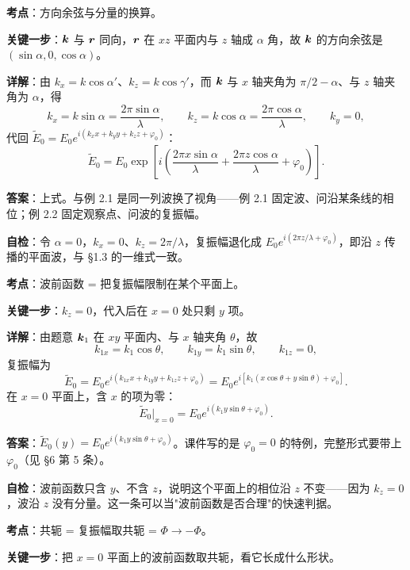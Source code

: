 \documentclass[10pt]{ctexart}
\renewcommand{\qbreak}{\needspace{0.55\textheight}}
\newcommand{\Ez}{\tilde{E}_0}
\begin{document}
\textbf{考点}：方向余弦与分量的换算。

\textbf{关键一步}：$\boldsymbol{k}$ 与 $\boldsymbol{r}$ 同向，$\boldsymbol{r}$ 在 $xz$ 平面内与 $z$ 轴成 $\alpha$ 角，故 $\boldsymbol{k}$ 的方向余弦是 $(\sin\alpha,0,\cos\alpha)$。

\textbf{详解}：由 $k_x=k\cos\alpha'$、$k_z=k\cos\gamma'$，而 $\boldsymbol{k}$ 与 $x$ 轴夹角为 $\pi/2-\alpha$、与 $z$ 轴夹角为 $\alpha$，得
\[
k_x=k\sin\alpha=\frac{2\pi\sin\alpha}{\lambda},
\qquad
k_z=k\cos\alpha=\frac{2\pi\cos\alpha}{\lambda},
\qquad
k_y=0,
\]
代回 $\Ez=E_0e^{i(k_xx+k_yy+k_zz+\varphi_0)}$：
\[
\Ez=E_0\exp\!\left[i\left(\frac{2\pi x\sin\alpha}{\lambda}+\frac{2\pi z\cos\alpha}{\lambda}+\varphi_0\right)\right].
\]

\textbf{答案}：上式。与例 2.1 是同一列波换了视角——例 2.1 固定波、问沿某条线的相位；例 2.2 固定观察点、问波的复振幅。

\textbf{自检}：令 $\alpha=0$，$k_x=0$、$k_z=2\pi/\lambda$，复振幅退化成 $E_0e^{i(2\pi z/\lambda+\varphi_0)}$，即沿 $z$ 传播的平面波，与 §1.3 的一维式一致。

\qbreak
{}

\textbf{考点}：波前函数 = 把复振幅限制在某个平面上。

\textbf{关键一步}：$k_z=0$，代入后在 $x=0$ 处只剩 $y$ 项。

\textbf{详解}：由题意 $\boldsymbol{k}_1$ 在 $xy$ 平面内、与 $x$ 轴夹角 $\theta$，故
\[
k_{1x}=k_1\cos\theta,\qquad k_{1y}=k_1\sin\theta,\qquad k_{1z}=0,
\]
复振幅为
\[
\Ez=E_0e^{i(k_{1x}x+k_{1y}y+k_{1z}z+\varphi_0)}=E_0e^{i[k_1(x\cos\theta+y\sin\theta)+\varphi_0]} .
\]
在 $x=0$ 平面上，含 $x$ 的项为零：
\[
\Ez\big|_{x=0}=E_0e^{i(k_1y\sin\theta+\varphi_0)} .
\]

\textbf{答案}：$\Ez(y)=E_0e^{i(k_1y\sin\theta+\varphi_0)}$。课件写的是 $\varphi_0=0$ 的特例，完整形式要带上 $\varphi_0$（见 §6 第 5 条）。

\textbf{自检}：波前函数只含 $y$、不含 $z$，说明这个平面上的相位沿 $z$ 不变——因为 $k_z=0$，波沿 $z$ 没有分量。这一条可以当"波前函数是否合理"的快速判据。

\qbreak
{}

\textbf{考点}：共轭 = 复振幅取共轭 = $\Phi\to-\Phi$。

\textbf{关键一步}：把 $x=0$ 平面上的波前函数取共轭，看它长成什么形状。
\end{document}

